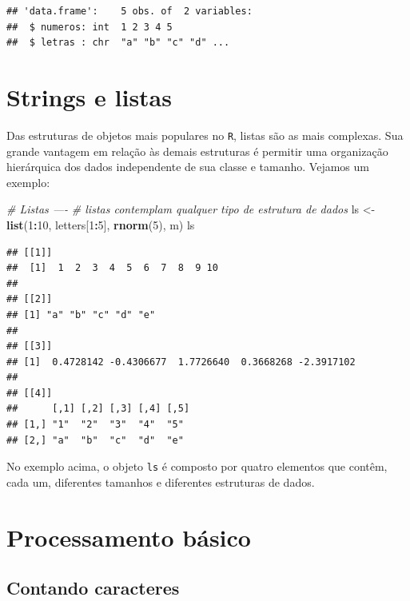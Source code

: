 \documentclass[]{book}
\newenvironment{Shaded}{\begin{snugshade}}{\end{snugshade}}
\newcommand{\CommentTok}[1]{\textcolor[rgb]{0.56,0.35,0.01}{\textit{#1}}}
\newcommand{\DecValTok}[1]{\textcolor[rgb]{0.00,0.00,0.81}{#1}}
\newcommand{\KeywordTok}[1]{\textcolor[rgb]{0.13,0.29,0.53}{\textbf{#1}}}
\newcommand{\NormalTok}[1]{#1}
\newcommand{\OperatorTok}[1]{\textcolor[rgb]{0.81,0.36,0.00}{\textbf{#1}}}
\newcommand{\StringTok}[1]{\textcolor[rgb]{0.31,0.60,0.02}{#1}}
\begin{document}
\begin{verbatim}
## 'data.frame':	5 obs. of  2 variables:
##  $ numeros: int  1 2 3 4 5
##  $ letras : chr  "a" "b" "c" "d" ...
\end{verbatim}

\hypertarget{strings-e-listas}{%
\section{Strings e listas}\label{strings-e-listas}}

Das estruturas de objetos mais populares no \texttt{R}, listas são as mais complexas. Sua grande vantagem em relação às demais estruturas é permitir uma organização hierárquica dos dados independente de sua classe e tamanho. Vejamos um exemplo:

\begin{Shaded}
\begin{Highlighting}[]
\CommentTok{# Listas ----}
\CommentTok{# listas contemplam qualquer tipo de estrutura de dados}
\NormalTok{ls <-}\StringTok{ }\KeywordTok{list}\NormalTok{(}\DecValTok{1}\OperatorTok{:}\DecValTok{10}\NormalTok{, letters[}\DecValTok{1}\OperatorTok{:}\DecValTok{5}\NormalTok{], }\KeywordTok{rnorm}\NormalTok{(}\DecValTok{5}\NormalTok{), m)}
\NormalTok{ls}
\end{Highlighting}
\end{Shaded}

\begin{verbatim}
## [[1]]
##  [1]  1  2  3  4  5  6  7  8  9 10
## 
## [[2]]
## [1] "a" "b" "c" "d" "e"
## 
## [[3]]
## [1]  0.4728142 -0.4306677  1.7726640  0.3668268 -2.3917102
## 
## [[4]]
##      [,1] [,2] [,3] [,4] [,5]
## [1,] "1"  "2"  "3"  "4"  "5" 
## [2,] "a"  "b"  "c"  "d"  "e"
\end{verbatim}

No exemplo acima, o objeto \texttt{ls} é composto por quatro elementos que contêm, cada um, diferentes tamanhos e diferentes estruturas de dados.

\hypertarget{processamento-buxe1sico}{%
\section{Processamento básico}\label{processamento-buxe1sico}}

\hypertarget{contando-caracteres}{%
\subsection{Contando caracteres}\label{contando-caracteres}}
\end{document}
